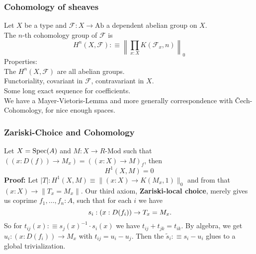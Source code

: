 \documentclass{beamer}
\begin{document}
\begin{frame}
  \frametitle{Cohomology of sheaves}
  Let $X$ be a type and $\mathcal F:X\to \mathrm{Ab}$ a dependent abelian group on $X$. \\
  \pause
  The $n$-th cohomology group of $\mathcal F$ is
  \[ H^n(X,\mathcal F):\equiv\left\|\prod_{x:X}K(\mathcal F_x,n)\right\|_0 \]
  \pause
  Properties: \\
  \pause
  The $H^n(X,\mathcal F)$ are all abelian groups. \\
  \pause
  Functoriality, covariant in $\mathcal F$, contravariant in $X$. \\
  \pause
  Some long exact sequence for coefficients. \\
  \pause
  We have a Mayer-Vietoris-Lemma and more generally correspondence with \v{C}ech-Cohomology, for nice enough spaces. \\
\end{frame}

\begin{frame}
  \frametitle{Zariski-Choice and Cohomology}  
  Let $X=\operatorname{Spec}(A)$ and $M:X\to R\text{-Mod}$ such that $((x:D(f))\to M_x)=((x:X)\to M)_f$, then
  \[ H^1(X,M)=0 \]
  \pause
  \textbf{Proof:} Let $|T|: H^1(X,M)\equiv \|(x:X)\to K(M_x,1)\|_0$ and from that $(x:X)\to \|T_x=M_x\|$.
  \pause
  Our third axiom, \textbf{Zariski-local choice}, merely gives us coprime $f_1,\dots,f_n:A$, such that for each $i$ we have
  \[
    s_i:(x:D(f_i)) \to T_x=M_x
    \rlap{.}
  \]
  \pause
  So for $t_{ij}(x):\equiv s_j(x)^{-1}\cdot s_i(x)$ we have $t_{ij}+t_{jk}=t_{ik}$.
  \pause
  By algebra, we get $u_i:(x:D(f_i))\to M_x$ with $t_{ij}=u_i-u_j$.
  Then the $\tilde{s}_i:\equiv s_i-u_i$ glues to a global trivialization.
\end{frame}
\end{document}
